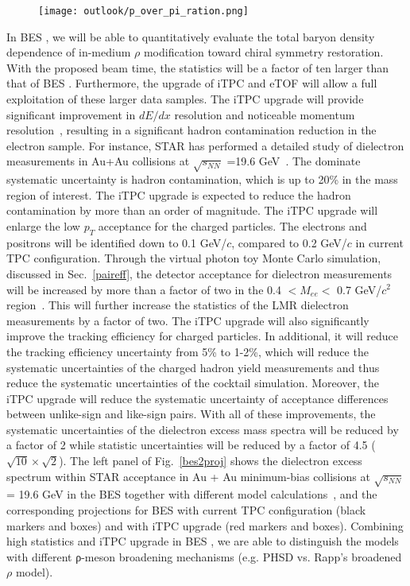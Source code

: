  \begin{figure}[htbp]
\centering
\texttt{[image: outlook/p\_over\_pi\_ration.png]}
 \label{ppiratio}
\end{figure}

In BES \uppercase\expandafter{}, we will be able to quantitatively evaluate the total baryon density dependence of in-medium $\rho$ modification toward chiral symmetry restoration. With the proposed beam time, the statistics will be a factor of ten larger than that of BES \uppercase\expandafter{}. Furthermore, the upgrade of iTPC and eTOF will allow a full exploitation of these larger data samples. The iTPC upgrade will provide significant improvement in $dE/dx$ resolution and noticeable momentum resolution~\cite{iTPC}, resulting in a significant hadron contamination reduction in the electron sample. For instance, STAR has performed a detailed study of dielectron measurements in Au+Au collisions at $\sqrt{s_{NN}}$ =19.6 GeV~\cite{STAR:dielectron2}. The dominate systematic uncertainty is hadron contamination, which is up to 20\% in the mass region of interest. The iTPC upgrade is expected to reduce the hadron contamination by more than an order of magnitude. The iTPC upgrade will enlarge the low $p_{T}$ acceptance for the charged particles. The electrons and positrons will be identified down to 0.1 GeV/$c$, compared to 0.2 GeV/$c$ in current TPC configuration. Through the virtual photon toy Monte Carlo simulation, discussed in Sec.~\ref{paireff}, the detector acceptance for dielectron measurements will be increased by more than a factor of two in the 0.4 $<M_{ee}<$ 0.7 GeV/$c^{2}$ region~\cite{iTPC}. This will further increase the statistics of the LMR dielectron measurements by a factor of two. The iTPC upgrade will also significantly improve the tracking efficiency for charged particles. In additional, it will reduce the tracking efficiency uncertainty from 5\% to 1-2\%, which will reduce the systematic uncertainties of the charged hadron yield measurements and thus reduce the systematic uncertainties of the cocktail simulation. Moreover, the iTPC upgrade will reduce the systematic uncertainty of acceptance differences between unlike-sign and like-sign pairs. With all of these improvements, the systematic uncertainties of the dielectron excess mass spectra will be reduced by a factor of 2 while statistic uncertainties will be reduced by a factor of 4.5 ($\sqrt{10}\times\sqrt{2}$). The left panel of Fig.~\ref{bes2proj} shows the dielectron excess spectrum within STAR acceptance in Au + Au minimum-bias collisions at $\sqrt{s_{NN}}$ = 19.6 GeV in the BES \uppercase\expandafter{} together with different model calculations~\cite{STAR:dielectron2}, and the corresponding projections for BES \uppercase\expandafter{} with current TPC configuration (black markers and boxes) and with iTPC upgrade (red markers and boxes). Combining high statistics and iTPC upgrade in BES \uppercase\expandafter{}, we are able to distinguish the models with different ρ-meson broadening mechanisms (e.g. PHSD vs. Rapp's broadened $\rho$ model). 